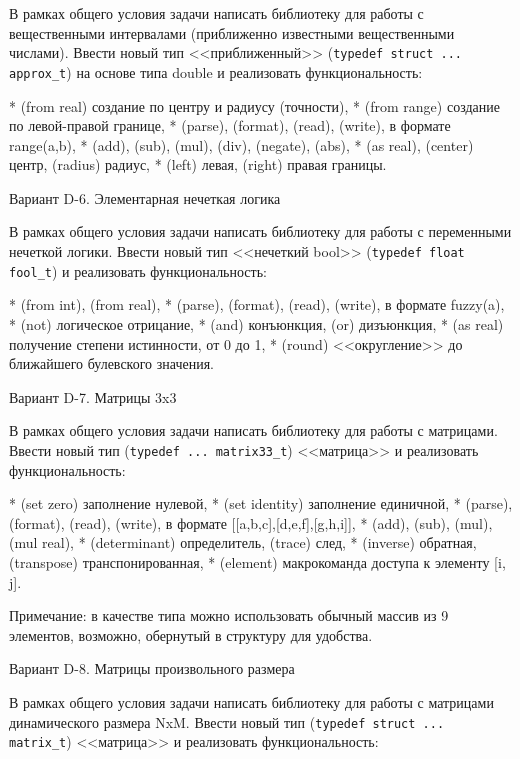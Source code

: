 В рамках общего условия задачи написать библиотеку для работы с вещественными
интервалами (приближенно известными вещественными числами). Ввести новый тип
<<приближенный>> (\verb|typedef struct ... approx_t|) на основе типа double и реализовать
функциональность:

* (from real) создание по центру и радиусу (точности),
* (from range) создание по левой-правой границе,
* (parse), (format), (read), (write), в формате range(a,b),
* (add), (sub), (mul), (div), (negate), (abs),
* (as real), (center) центр, (radius) радиус,
* (left) левая, (right) правая границы.


Вариант D-6. Элементарная нечеткая логика

В рамках общего условия задачи написать библиотеку для работы с переменными
нечеткой логики. Ввести новый тип <<нечеткий bool>> (\verb|typedef float fool_t|) и
реализовать функциональность:

* (from int), (from real),
* (parse), (format), (read), (write), в формате fuzzy(a),
* (not) логическое отрицание,
* (and) конъюнкция, (or) дизъюнкция,
* (as real) получение степени истинности, от 0 до 1,
* (round) <<округление>> до ближайшего булевского значения.


Вариант D-7. Матрицы 3x3

В рамках общего условия задачи написать библиотеку для работы с матрицами.
Ввести новый тип (\verb|typedef ... matrix33_t|) <<матрица>> и реализовать
функциональность:

* (set zero) заполнение нулевой,
* (set identity) заполнение единичной,
* (parse), (format), (read), (write), в формате [[a,b,c],[d,e,f],[g,h,i]],
* (add), (sub), (mul), (mul real),
* (determinant) определитель, (trace) след,
* (inverse) обратная, (transpose) транспонированная,
* (element) макрокоманда доступа к элементу [i, j].

Примечание: в качестве типа можно использовать обычный массив из 9 элементов,
возможно, обернутый в структуру для удобства.


Вариант D-8. Матрицы произвольного размера

В рамках общего условия задачи написать библиотеку для работы с матрицами
динамического размера NxM. Ввести новый тип (\verb|typedef struct ... matrix_t|)
<<матрица>> и реализовать функциональность:

